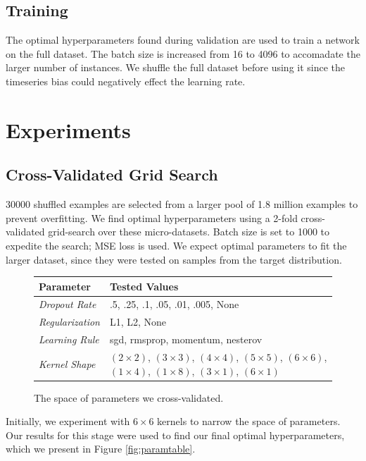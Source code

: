 \documentclass{article}
\begin{document}
\subsection{Training}

The optimal hyperparameters found during validation are used to train a network on the full dataset.  The batch size is increased from 16 to 4096 to accomadate the larger number of instances.  We shuffle the full dataset before using it since the timeseries bias could negatively effect the learning rate.

\section{Experiments}

\subsection{Cross-Validated Grid Search}

30000 shuffled examples are selected from a larger pool of 1.8 million examples to prevent overfitting.  We find optimal hyperparameters using a 2-fold cross-validated grid-search over these micro-datasets.  Batch size is set to 1000 to expedite the search; MSE loss is used.  We expect optimal parameters to fit the larger dataset, since they were tested on samples from the target distribution.

\begin{figure}[ht]
\centering
\begin{tabular}{|l|l|}
\hline
\textbf{Parameter} & \textbf{Tested Values} \\
\hline
\textit{Dropout Rate} &  .5, .25, .1, .05, .01, .005, None \\
\textit{Regularization} &  L1, L2, None \\
\textit{Learning Rule} & sgd, rmsprop, momentum, nesterov \\
\textit{Kernel Shape} & $(2\times 2)$, $(3\times 3)$, $(4\times 4)$, $(5\times 5)$, $(6\times 6)$, $(1\times 4)$, $(1\times 8)$, $(3\times 1)$, $(6\times 1)$ \\
\hline
\end{tabular}
\caption{The space of parameters we cross-validated.}
\end{figure}

Initially, we experiment with $6\times 6$ kernels to narrow the space of parameters.  Our results for this stage were used to find our final optimal hyperparameters, which we present in Figure \ref{fig:paramtable}.
\end{document}
